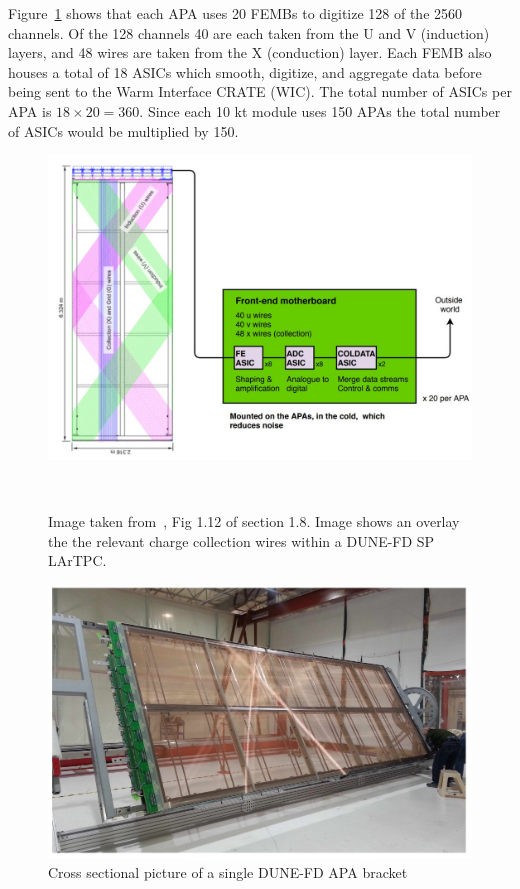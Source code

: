 Figure~\ref{fig:dune_tpc_electronics} shows that each APA uses 20 FEMBs to digitize 128 of the 2560 channels.
Of the 128 channels 40 are each taken from the U and V (induction) layers, and 48 wires are taken from the X (conduction) layer.
Each FEMB also houses a total of 18 ASICs which smooth, digitize, and aggregate data before being sent to the Warm Interface CRATE (WIC).
The total number of ASICs per APA is $18\times 20 = 360$.
Since each 10 kt module uses 150 APAs the total number of ASICs would be multiplied by 150.

\begin{figure}[]
\centering
\includegraphics[width=\textwidth]{images/dune_apa_motherboards.jpg}
\caption{Image taken from~\citep{DUNE-FD_TDRv4:Abi_2020}, Fig 1.12 of section 1.8.
Image shows an overlay the the relevant charge collection wires within a DUNE-FD SP LArTPC.
}~\label{fig:dune_tpc_electronics}
\end{figure}

\begin{figure}[]
\centering
\includegraphics[width=\textwidth]{images/dune_fd_tdr_apa_image.jpg}
\caption{Cross sectional picture of a single DUNE-FD APA bracket~\citep{DUNE-FD_TDRv4:Abi_2020}}
\label{fig:dune_apa_tdr}
\end{figure}

